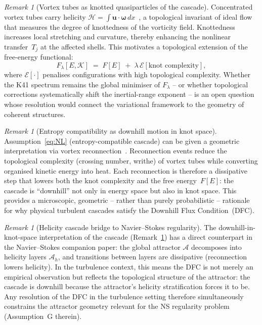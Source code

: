 \documentclass[12pt,a4paper]{article}
\theoremstyle{definition}
\theoremstyle{plain}
\theoremstyle{remark}
\newtheorem{remark}[definition]{Remark}
\begin{document}
\begin{remark}[Vortex tubes as knotted quasiparticles of the cascade]
\label{rem:vortex-tubes}
Concentrated vortex tubes carry helicity
$\mathcal{H} = \int \mathbf{u} \cdot \boldsymbol{\omega}\, dx$~\cite{Moffatt69},
a topological invariant of ideal flow that measures the degree of knottedness
of the vorticity field. Knottedness increases local stretching and curvature,
thereby enhancing the nonlinear transfer~$T_j$ at the affected shells. This
motivates a topological extension of the free-energy functional:
\[
  F_\lambda[E, \mathcal{K}] \;=\; F[E] \;+\; \lambda\, \mathcal{E}[\text{knot complexity}],
\]
where $\mathcal{E}[\cdot]$ penalises configurations with high topological
complexity. Whether the K41 spectrum remains the global minimiser of
$F_\lambda$ -- or whether topological corrections systematically shift the
inertial-range exponent -- is an open question whose resolution would connect
the variational framework to the geometry of coherent structures.
\end{remark}

\begin{remark}[Entropy compatibility as downhill motion in knot space]
\label{rem:downhill-knot}
Assumption~\eqref{eq:NL} (entropy-compatible cascade) can be given a geometric
interpretation via vortex reconnection~\cite{Moffatt69, ArnoldKhesin98}.
Reconnection events reduce the topological complexity (crossing number, writhe)
of vortex tubes while converting organised kinetic energy into heat. Each
reconnection is therefore a dissipative step that lowers both the knot
complexity and the free energy~$F[E]$: the cascade is ``downhill'' not only
in energy space but also in knot space. This provides a microscopic, geometric
-- rather than purely probabilistic -- rationale for why physical turbulent
cascades satisfy the Downhill Flux Condition~(DFC).
\end{remark}

\begin{remark}[Helicity cascade bridge to Navier--Stokes regularity]
\label{rem:helicity-cascade-bridge}
The downhill-in-knot-space interpretation of the cascade
(Remark~\ref{rem:downhill-knot}) has a direct counterpart in the
Navier--Stokes companion paper: the global attractor $\mathcal{A}$
decomposes into helicity layers $\mathcal{A}_h$, and transitions
between layers are dissipative (reconnection lowers helicity). In the
turbulence context, this means the DFC is not merely an empirical
observation but reflects the topological structure of the attractor:
the cascade is downhill because the attractor's helicity stratification
forces it to be. Any resolution of the DFC in the turbulence setting
therefore simultaneously constrains the attractor geometry relevant for
the NS regularity problem (Assumption~G therein).
\end{remark}
\end{document}
